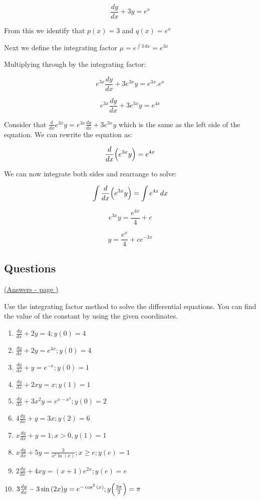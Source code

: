 \documentclass[../main.tex]{subfiles}
\begin{document}
\[\frac{dy}{dx}+3y=e^x\]

From this we identify that $p(x)=3$ and $q(x)=e^x$

Next we define the integrating factor $\mu=e^{\int 3\,dx}=e^{3x}$

Multiplying through by the integrating factor:

\[e^{3x}\frac{dy}{dx}+3e^{3x}y=e^{3x}.e^x\]

\[e^{3x}\frac{dy}{dx}+3e^{3x}y=e^{4x}\]

Consider that $\frac{d}{dx}e^{3x}y=e^{3x}\frac{dy}{dx}+3e^{3x}y$ which is the same as the left side of the equation. We can rewrite the equation as:

\[\frac{d}{dx}\Bigl(e^{3x}y\Bigr)=e^{4x}\]

We can now integrate both sides and rearrange to solve:

\[\int \frac{d}{dx}\Bigl(e^{3x}y\Bigr)=\int e^{4x}\,dx\]

\[e^{3x}y=\frac{e^{4x}}{4}+c\]

\[y=\frac{e^x}{4}+ce^{-3x}\]

\pagebreak
\hypertarget{integratingfactorlink}{\subsection*{Questions}}
\hyperlink{integratingfactoranswers}{(Answers - page {\pageref*{Integrating factor answers}})}

\label{Integrating factor method}

Use the integrating factor method to solve the differential equations. You can find the value of the constant by using the given coordinates.
\begin{enumerate}[itemsep=0.7cm]
    \item 
    $\frac{dy}{dx}+2y=4; y(0)=4$

    \item 
    $\frac{dy}{dx}+2y=e^{4x}; y(0)=4$

    \item 
    $\frac{dy}{dx}+y=e^{-x}; y(0)=1$

    \item 
    $\frac{dy}{dx}+2xy=x; y(1)=1$

    \item 
    $\frac{dy}{dx}+3x^2 y=e^{x-x^3}; y(0)=2$

    \item 
    $4\frac{dy}{dx}+y=3x; y(2)=6$

    \item 
    $x\frac{dy}{dx}+y=1; x>0, y(1)=1$

    \item 
    $x\frac{dy}{dx}+5y=\frac{3}{x^5 \ln{(x)}}; x\geq e; y(e)=1$

    \item 
    $2\frac{dy}{dx}+4xy=(x+1)e^{2x}; y(e)=e$

    \item 
    $3\frac{dy}{dx}-3\sin{(2x)}y=e^{-\cos^2{(x)}}; y\Bigl(\frac{3\pi}{2}\Bigr)=\pi$



\end{enumerate}
\end{document}
